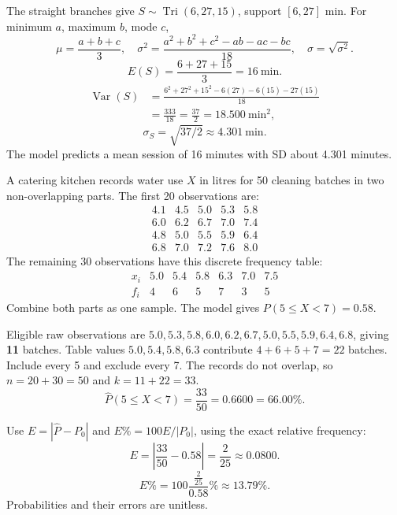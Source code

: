 The straight branches give $S\sim\operatorname{Tri}(6,27,15)$, support $[6,27]$ min.
For minimum $a$, maximum $b$, mode $c$,
\[\mu=\frac{a+b+c}3,\quad\sigma^2=\frac{a^2+b^2+c^2-ab-ac-bc}{18},\quad\sigma=\sqrt{\sigma^2}.\]
\[E(S)=\frac{6+27+15}3=16\ \text{min}.\]
\[\begin{aligned}\operatorname{Var}(S)&=\frac{6^2+27^2+15^2-6(27)-6(15)-27(15)}{18}\\&=\frac{333}{18}=\frac{37}2=18.500\ \text{min}^2,\end{aligned}\]
\[\sigma_S=\sqrt{37/2}\approx4.301\ \text{min}.\]
The model predicts a mean session of 16 minutes with SD about 4.301 minutes.

A catering kitchen records water use $X$ in litres for 50 cleaning batches in two non-overlapping parts. The first 20 observations are:
\[\begin{array}{rrrrr}4.1&4.5&5.0&5.3&5.8\\6.0&6.2&6.7&7.0&7.4\\4.8&5.0&5.5&5.9&6.4\\6.8&7.0&7.2&7.6&8.0\end{array}\]
The remaining 30 observations have this discrete frequency table:
\[\begin{array}{c|rrrrrr}x_i&5.0&5.4&5.8&6.3&7.0&7.5\\\hline f_i&4&6&5&7&3&5\end{array}\]
Combine both parts as one sample. The model gives $P(5\le X<7)=0.58$.


Eligible raw observations are $5.0,5.3,5.8,6.0,6.2,6.7,5.0,5.5,5.9,6.4,6.8$, giving \textbf{11} batches.
Table values $5.0,5.4,5.8,6.3$ contribute $4+6+5+7=22$ batches. Include every 5 and exclude every 7.
The records do not overlap, so $n=20+30=50$ and $k=11+22=33$.
\[\widehat P(5\le X<7)=\frac{33}{50}=0.6600=66.00\%.\]

Use $E=|\widehat P-P_0|$ and $E\%=100E/|P_0|$, using the exact relative frequency:
\[E=\left|\frac{33}{50}-0.58\right|=\frac{2}{25}\approx0.0800.\]
\[E\%=100\frac{\frac{2}{25}}{0.58}\%\approx13.79\%.\]
Probabilities and their errors are unitless.

